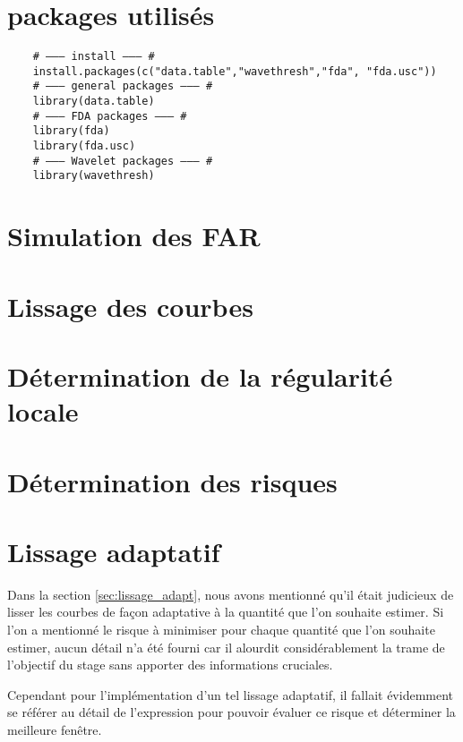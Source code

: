\section{packages utilisés}

\begin{verbatim}
    # ——— install ——— #
    install.packages(c("data.table","wavethresh","fda", "fda.usc"))
    # ——— general packages ——— #
    library(data.table)
    # ——— FDA packages ——— #
    library(fda)
    library(fda.usc)
    # ——— Wavelet packages ——— #
    library(wavethresh)
\end{verbatim}

\section{Simulation des FAR}


\section{Lissage des courbes}


\section{Détermination de la régularité locale}


\section{Détermination des risques}


\section{Lissage adaptatif}

Dans la section \ref{sec:lissage_adapt}, nous avons mentionné qu'il était judicieux de lisser les courbes de façon adaptative à la quantité que l'on souhaite estimer. Si l'on a mentionné le risque à minimiser pour chaque quantité que l'on souhaite estimer, aucun détail n'a été fourni car il alourdit considérablement la trame de l'objectif du stage sans apporter des informations cruciales.

\bigskip

Cependant pour l'implémentation d'un tel lissage adaptatif, il fallait évidemment se référer au détail de l'expression pour pouvoir évaluer ce risque et déterminer la meilleure fenêtre.

